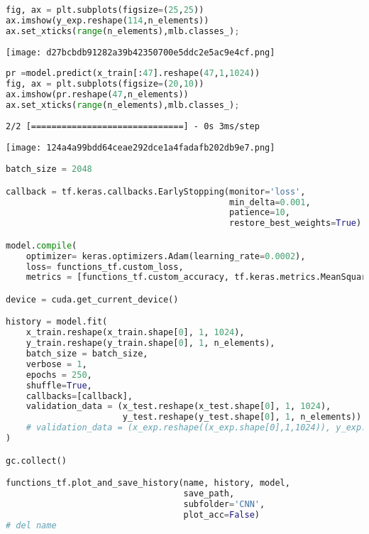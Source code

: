 \begin{lstlisting}[language=Python]
fig, ax = plt.subplots(figsize=(25,25))
ax.imshow(y_exp.reshape(114,n_elements))
ax.set_xticks(range(n_elements),mlb.classes_);
\end{lstlisting}

\texttt{[image: d27bcbdb91282a39b42350700e5ddc2e5ac9e4cf.png]}

\begin{lstlisting}[language=Python]
pr =model.predict(x_train[:47].reshape(47,1,1024))
fig, ax = plt.subplots(figsize=(20,10))
ax.imshow(pr.reshape(47,n_elements))
ax.set_xticks(range(n_elements),mlb.classes_);
\end{lstlisting}

\begin{lstlisting}
2/2 [==============================] - 0s 3ms/step
\end{lstlisting}

\texttt{[image: 124a4a99bdd64ceae292dce1a4fadafb202db9e7.png]}

\begin{lstlisting}[language=Python]
batch_size = 2048

callback = tf.keras.callbacks.EarlyStopping(monitor='loss',
                                            min_delta=0.001,
                                            patience=10,
                                            restore_best_weights=True)

model.compile(
    optimizer= keras.optimizers.Adam(learning_rate=0.0002),
    loss= functions_tf.custom_loss,
    metrics = [functions_tf.custom_accuracy, tf.keras.metrics.MeanSquaredError()])

device = cuda.get_current_device()

history = model.fit(
    x_train.reshape(x_train.shape[0], 1, 1024),
    y_train.reshape(y_train.shape[0], 1, n_elements),
    batch_size = batch_size,
    verbose = 1,
    epochs = 250,
    shuffle=True,
    callbacks=[callback],
    validation_data = (x_test.reshape(x_test.shape[0], 1, 1024), 
                       y_test.reshape(y_test.shape[0], 1, n_elements))
    # validation_data = (x_exp.reshape((x_exp.shape[0],1,1024)), y_exp.reshape((y_exp.shape[0],1,n_elements))),
)

gc.collect()

functions_tf.plot_and_save_history(name, history, model, 
                                   save_path,
                                   subfolder='CNN',
                                   plot_acc=False)
# del name
\end{lstlisting}

